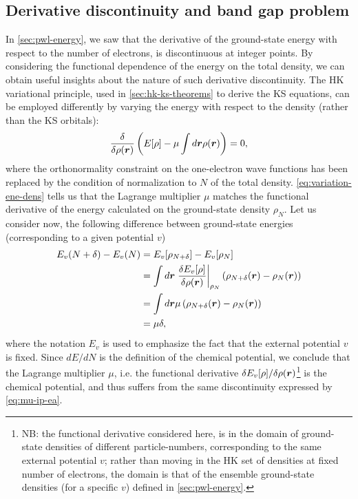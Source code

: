 \subsection{Derivative discontinuity and band gap problem\label{sec:deriv-dis}}
In \cref{sec:pwl-energy}, we saw that the derivative of the ground-state energy with respect to the number of electrons, is discontinuous at integer points. By considering the functional dependence of the energy on the total density, we can obtain useful insights about the nature of such derivative discontinuity. The HK variational principle, used in \cref{sec:hk-ks-theorems} to derive the KS equations, can be employed differently by varying the energy with respect to the density (rather than the KS orbitals):
%
\begin{equation}
    \frac{\delta}{\delta \rho({\bm r})}\left( E[\rho] - \mu \int d{\bm r} \rho({\bm r}) \right) = 0,
    \label{eq:variation-ene-dens}
\end{equation}
%
where the orthonormality constraint on the one-electron wave functions has been replaced by the condition of normalization to $N$ of the total density. \cref{eq:variation-ene-dens} tells us that the Lagrange multiplier $\mu$ matches the functional derivative of the energy calculated on the ground-state density $\rho_N$. Let us consider now, the following difference between ground-state energies (corresponding to a given potential $v$)
%
\begin{equation}
    \begin{split}
    E_v(N+\delta) - E_v(N) &= E_v[\rho_{N+\delta}] - E_v[\rho_{N}] \\
    &= \int d{\bm r} \left. \frac{\delta E_v[\rho]}{\delta \rho({\bm r})} \right|_{\rho_N} \left( \rho_{N+\delta}({\bm r}) - \rho_N({\bm r}) \right) \\
    &= \int d{\bm r} \mu \left( \rho_{N+\delta}({\bm r}) - \rho_N({\bm r}) \right) \\
    &= \mu \delta ,
    \end{split}
    \label{eq:mu-matching}
\end{equation}
%
where the notation $E_v$ is used to emphasize the fact that the external potential $v$ is fixed. Since $dE/dN$ is the definition of the chemical potential, we conclude that the Lagrange multiplier $\mu$, i.e. the functional derivative $\delta E_v[\rho]/\delta \rho({\bm r})$\footnote{NB: the functional derivative considered here, is in the domain of ground-state densities of different particle-numbers, corresponding to the same external potential $v$; rather than moving in the HK set of densities at fixed number of electrons, the domain is that of the ensemble ground-state densities (for a specific $v$) defined in \cref{sec:pwl-energy}.} is the chemical potential, and thus suffers from the same discontinuity expressed by \cref{eq:mu-ip-ea}.

